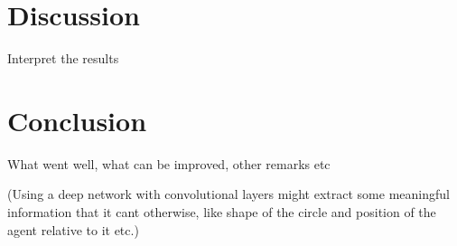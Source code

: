 \section{Discussion}\label{sec:discussion}
Interpret the results

\section{Conclusion}\label{sec:conclusions}
What went well, what can be improved, other remarks etc

(Using a deep network with convolutional layers might extract some meaningful information that it cant otherwise, like shape of the circle and position of the agent relative to it etc.)